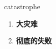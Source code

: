 
\begin{frame}
{\huge catastrophe}
\begin{center}
\begin{enumerate}\Large
  \item \textbf{大灾难}
  \item \textbf{彻底的失败}
\end{enumerate}
\end{center}
\end{frame}
